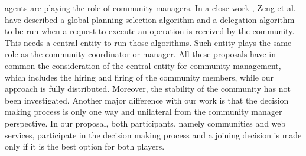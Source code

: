 \documentclass[11pt,onecolumn]{IEEEtran}
\begin{document}
{agents are playing the role of community managers. In a close work
\cite{Zeng:2003:QDW:775152.775211}, Zeng et al. have described a
global planning selection algorithm and a delegation algorithm to
be run when a request to execute an operation is received by the
community. This needs a central entity to run those algorithms.
Such entity plays the same role as the community coordinator or
manager. All these proposals have in common the consideration 
of the central entity for community management, which includes the hiring and firing of the community members, while our approach is fully distributed. Moreover, the stability of the community has not been investigated. Another major difference with our work is that the decision making process is only one way and unilateral from the community manager perspective. In our proposal, both participants, namely communities and web services, participate in the decision making process and a joining decision is made only if it is the best option for both players.








}
\end{document}
